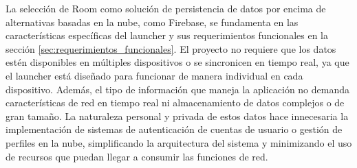 La selección de Room como solución de persistencia de datos por encima de alternativas basadas en la nube, como Firebase, se fundamenta en las características específicas del launcher y sus requerimientos funcionales en la sección \ref{sec:requerimientos_funcionales}. El proyecto no requiere que los datos estén disponibles en múltiples dispositivos o se sincronicen en tiempo real, ya que el launcher está diseñado para funcionar de manera individual en cada dispositivo. Además, el tipo de información que maneja la aplicación no demanda características de red en tiempo real ni almacenamiento de datos complejos o de gran tamaño. La naturaleza personal y privada de estos datos hace innecesaria la implementación de sistemas de autenticación de cuentas de usuario o gestión de perfiles en la nube, simplificando la arquitectura del sistema y minimizando el uso de recursos que puedan llegar a consumir las funciones de red.
